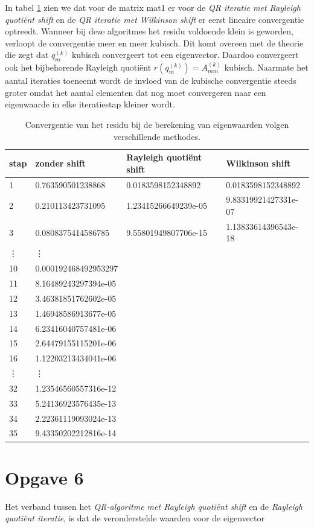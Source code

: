 \documentclass[a4paper]{article}
\newcommand{\opgave}[1]{\section*{Opgave #1}}
\begin{document}
In tabel \ref{table:tab2} zien we dat voor de matrix mat1 er voor de \textit{QR iteratie met Rayleigh quoti\"{e}nt shift} en de \textit{QR iteratie met Wilkinson shift} er eerst lineaire convergentie optreedt. Wanneer bij deze algoritmes het residu voldoende klein is geworden, verloopt de convergentie meer en meer kubisch. Dit komt overeen met de theorie die zegt dat $q_m^{(k)}$ kubisch convergeert tot een eigenvector. Daardoo convergeert ook het bijbehorende Rayleigh quoti\"{e}nt $r(q_m^{(k)})=A_{mm}^{(k)}$ kubisch. Naarmate het aantal iteraties toeneemt wordt de invloed van de kubische convergentie steeds groter omdat het aantal elementen dat nog moet convergeren naar een eigenwaarde in elke iteratiestap kleiner wordt.
\begin{table}[h]
\begin{tabular}{|l|l|l|l|}
\hline
stap & zonder shift & Rayleigh quoti\"{e}nt shift & Wilkinson shift \\
\hline
1 & 0.763590501238868 & 0.0183598152348892 & 0.0183598152348892 \\
2 & 0.210113423731095 & 1.23415266649239e-05 & 9.83319921427331e-07 \\
3 & 0.0808375414586785 & 9.55801949807706e-15 & 1.13833614396543e-18 \\
\vdots & \vdots &  &  \\
10 & 0.000192468492953297 &  &  \\
11 & 8.16489243297394e-05 &  &  \\
12 & 3.46381851762602e-05 &  &  \\
13 & 1.46948586913677e-05 &  &  \\
14 & 6.23416040757481e-06 &  &  \\
15 & 2.64479155115201e-06 &  &  \\
16 & 1.12203213434041e-06 &  &  \\
\vdots & \vdots &  &  \\
32 & 1.23546560557316e-12 &  &  \\
33 & 5.24136923576435e-13 &  &  \\
34 & 2.22361119093024e-13 &  &  \\
35 & 9.43350202212816e-14 &  &  \\
\hline
\end{tabular}
\caption{Convergentie van het residu bij de berekening van eigenwaarden volgen verschillende methodes.}
\label{table:tab2}
\end{table}
\opgave{6}
Het verband tussen het \textit{QR-algoritme met Rayleigh quoti\"{e}nt shift} en de \textit{Rayleigh quoti\"{e}nt iteratie}, is dat de veronderstelde waarden voor de eigenvector
\end{document}
